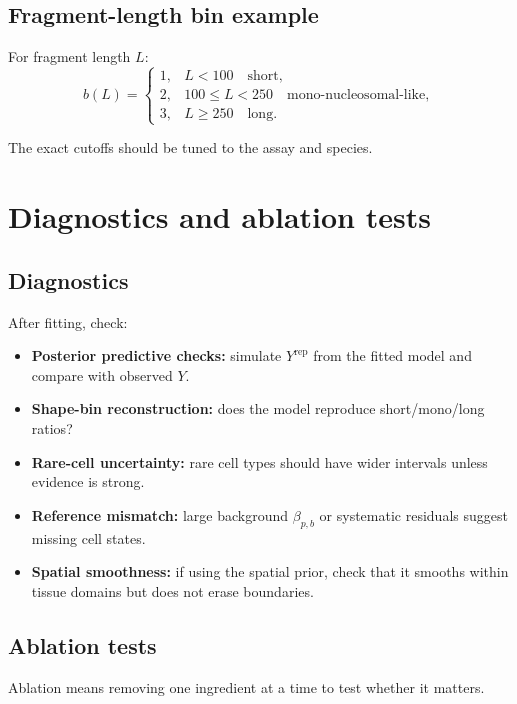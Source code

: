 \documentclass[11pt]{article}
\begin{document}
\subsection{Fragment-length bin example}

For fragment length \(L\):
\[
 b(L)=
 \begin{cases}
 1, & L < 100 \quad \text{short},\\
 2, & 100 \le L < 250 \quad \text{mono-nucleosomal-like},\\
 3, & L \ge 250 \quad \text{long}.
 \end{cases}
\]

The exact cutoffs should be tuned to the assay and species.

\section{Diagnostics and ablation tests}

\subsection{Diagnostics}

After fitting, check:

\begin{itemize}[leftmargin=2em]
    \item \textbf{Posterior predictive checks:} simulate \(Y^{\mathrm{rep}}\) from the fitted model and compare with observed \(Y\).
    \item \textbf{Shape-bin reconstruction:} does the model reproduce short/mono/long ratios?
    \item \textbf{Rare-cell uncertainty:} rare cell types should have wider intervals unless evidence is strong.
    \item \textbf{Reference mismatch:} large background \(\beta_{p,b}\) or systematic residuals suggest missing cell states.
    \item \textbf{Spatial smoothness:} if using the spatial prior, check that it smooths within tissue domains but does not erase boundaries.
\end{itemize}

\subsection{Ablation tests}

Ablation means removing one ingredient at a time to test whether it matters.
\end{document}
